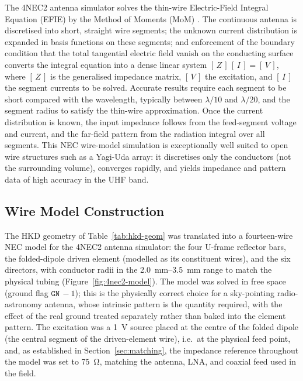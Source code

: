 The 4NEC2 antenna simulator solves the thin-wire Electric-Field Integral
Equation (EFIE) by the Method of Moments (MoM) \citep{harrington1993,nec2}. The
continuous antenna is discretised into short, straight wire segments; the unknown
current distribution is expanded in basis functions on these segments; and
enforcement of the boundary condition that the total tangential electric field
vanish on the conducting surface converts the integral equation into a dense
linear system $[\,Z\,]\,[\,I\,] = [\,V\,]$, where $[\,Z\,]$ is the generalised
impedance matrix, $[\,V\,]$ the excitation, and $[\,I\,]$ the segment currents
to be solved. Accurate results require each segment to be short compared with
the wavelength, typically between $\lambda/10$ and $\lambda/20$, and the
segment radius to satisfy the thin-wire approximation. Once the current
distribution is known, the input impedance follows from the feed-segment voltage
and current, and the far-field pattern from the radiation integral over all
segments. This NEC wire-model simulation is exceptionally well suited to open
wire structures such as a Yagi-Uda array: it discretises only the conductors
(not the surrounding volume), converges rapidly, and yields impedance and
pattern data of high accuracy in the UHF band.

\subsection{Wire Model Construction}
\label{subsec:model}

The HKD geometry of Table~\ref{tab:hkd-geom} was translated into a
fourteen-wire NEC model for the 4NEC2 antenna simulator: the four U-frame
reflector bars, the folded-dipole driven element (modelled as its constituent
wires), and the six directors, with conductor radii in the
\SIrange{2.0}{3.5}{\milli\metre} range to match the physical tubing
(Figure~\ref{fig:4nec2-model}). The model was solved in free space (ground flag
$\texttt{GN}\,{-}1$); this is the physically correct choice for a
sky-pointing radio-astronomy antenna, whose intrinsic pattern is the quantity
required, with the effect of the real ground treated separately rather than
baked into the element pattern. The excitation was a \SI{1}{\volt} source
placed at the centre of the folded dipole (the central segment of the
driven-element wire), i.e.\ at the physical feed point, and, as established
in Section~\ref{sec:matching}, the impedance reference throughout the model
was set to \SI{75}{\ohm}, matching the antenna, LNA, and coaxial feed used in
the field.

